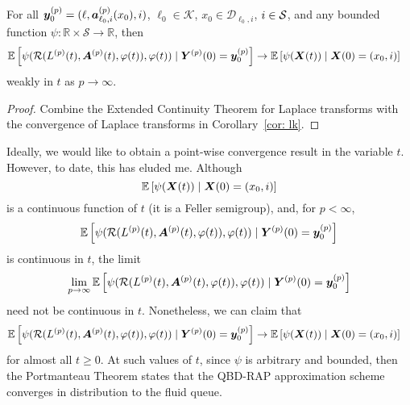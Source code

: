 \begin{thm}
	For all \(\boldsymbol y_0^{(p)}=(\ell,\boldsymbol a_{\ell_0,i}^{(p)}(x_0),i)\), \(\ell_0\in\mathcal K\), \(x_0\in\mathcal D_{\ell_0,i}\), \(i\in\mathcal{S}\), and any bounded function \(\psi:\mathbb R\times \mathcal S \to \mathbb R\), then
	\begin{align}
			&\mathbb E\left[\psi( \mathcal R(L^{(p)}(t),\boldsymbol A^{(p)}(t),\varphi(t)),\varphi(t) )   \mid \boldsymbol Y^{(p)}(0)=\boldsymbol y_0^{(p)} \right] \nonumber 
			\to \mathbb E\left[\psi({\boldsymbol X}(t))\mid \boldsymbol X(0)=(x_0, i) \right] \nonumber
	\end{align}
	weakly in \(t\) as \(p\to \infty\). 
\end{thm}
\begin{proof}
	Combine the Extended Continuity Theorem for Laplace transforms \cite[Chapter XIII, Theorem 2a]{feller1957} with the convergence of Laplace transforms in Corollary~\ref{cor: lk}. 
\end{proof}

Ideally, we would like to obtain a point-wise convergence result in the variable \(t\). However, to date, this has eluded me. Although 
\[\mathbb E\left[\psi({\boldsymbol X}(t))\mid \boldsymbol X(0)=(x_0,i) \right]\] 
is a continuous function of \(t\) (it is a Feller semigroup), and, for \(p<\infty\), 
\[\mathbb E\left[\psi( \mathcal R(L^{(p)}(t),\boldsymbol A^{(p)}(t),\varphi(t)),\varphi(t) )   \mid \boldsymbol Y^{(p)}(0)=\boldsymbol y_0^{(p)} \right]  \]
 is continuous in \(t\), the limit 
 \[\lim\limits_{p\to\infty}\mathbb E\left[\psi( \mathcal R(L^{(p)}(t),\boldsymbol A^{(p)}(t),\varphi(t)),\varphi(t) ) \mid \boldsymbol Y^{(p)}(0)=\boldsymbol y_0^{(p)}\right]  \] need not be continuous in \(t\). Nonetheless, we can claim that 
\begin{align}
		&\mathbb E\left[\psi( \mathcal R(L^{(p)}(t),\boldsymbol A^{(p)}(t),\varphi(t)),\varphi(t) )    \mid \boldsymbol Y^{(p)}(0)=\boldsymbol y_0^{(p)}\right]  \nonumber
		\to \mathbb E\left[\psi({\boldsymbol X}(t) )\mid \boldsymbol X(0)=(x_0, i) \right] \nonumber
\end{align}
for almost all \(t\geq 0\). At such values of \(t\), since \(\psi\) is arbitrary and bounded, then the Portmanteau Theorem \citep[Theorem 2.1]{billingsleyconvergence} states that the QBD-RAP approximation scheme converges in distribution to the fluid queue.

